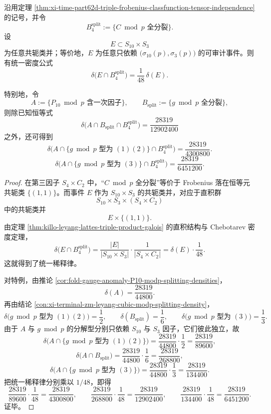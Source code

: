 \begin{theorem}\label{thm:xi-time-part62e-l4-fullsplit-universal-dilution}
沿用定理 \ref{thm:xi-time-part62d-triple-frobenius-classfunction-tensor-independence} 的记号，并令
\[
B_4^{\mathrm{split}}
:=
\{\text{\(C\bmod p\) 全分裂}\}.
\]
设
\[
E\subset S_{10}\times S_3
\]
为任意共轭类并；等价地，\(E\) 为任意只依赖 \(\bigl(\sigma_{10}(p),\sigma_3(p)\bigr)\) 的可审计事件。则有统一密度公式
\[
\boxed{\;
\delta\!\bigl(E\cap B_4^{\mathrm{split}}\bigr)=\frac{1}{48}\,\delta(E).\;}
\]

特别地，令
\[
A:=\{\text{\(P_{10}\bmod p\) 含一次因子}\},
\qquad
B_{\mathrm{split}}:=\{\text{\(g\bmod p\) 全分裂}\},
\]
则除已知恒等式
\[
\delta\!\bigl(A\cap B_{\mathrm{split}}\cap B_4^{\mathrm{split}}\bigr)
=
\frac{28319}{12902400}
\]
之外，还可得到
\[
\boxed{\;
\delta\!\bigl(A\cap\{g\bmod p\text{ 型为 }(1)(2)\}\cap B_4^{\mathrm{split}}\bigr)
=
\frac{28319}{4300800}.\;}
\]
\[
\boxed{\;
\delta\!\bigl(A\cap\{g\bmod p\text{ 型为 }(3)\}\cap B_4^{\mathrm{split}}\bigr)
=
\frac{28319}{6451200}.\;}
\]
\end{theorem}
\begin{proof}
在第三因子 \(S_4\times C_2\) 中，“\(C\bmod p\) 全分裂”等价于 Frobenius 落在恒等元共轭类 \(\{(1,1)\}\)。而事件 \(E\) 作为 \(S_{10}\times S_3\) 的共轭类并，对应于直积群
\[
S_{10}\times S_3\times (S_4\times C_2)
\]
中的共轭类并
\[
E\times\{(1,1)\}.
\]
由定理 \ref{thm:killo-leyang-lattes-triple-product-galois} 的直积结构与 Chebotarev 密度定理，
\[
\delta\!\bigl(E\cap B_4^{\mathrm{split}}\bigr)
=
\frac{|E|}{|S_{10}\times S_3|}\cdot \frac{1}{|S_4\times C_2|}
=
\delta(E)\cdot \frac{1}{48}.
\]
这就得到了统一稀释律。

对特例，由推论 \ref{cor:fold-gauge-anomaly-P10-modp-splitting-densities}，
\[
\delta(A)=\frac{28319}{44800}.
\]
再由结论 \ref{con:xi-terminal-zm-leyang-cubic-modp-splitting-density}，
\[
\delta\!\bigl(g\bmod p\text{ 型为 }(1)(2)\bigr)=\frac12,
\qquad
\delta(B_{\mathrm{split}})=\frac16,
\qquad
\delta\!\bigl(g\bmod p\text{ 型为 }(3)\bigr)=\frac13.
\]
由于 \(A\) 与 \(g\bmod p\) 的分解型分别只依赖 \(S_{10}\) 与 \(S_3\) 因子，它们彼此独立，故
\[
\delta\!\bigl(A\cap\{g\bmod p\text{ 型为 }(1)(2)\}\bigr)
=
\frac{28319}{44800}\cdot\frac12
=
\frac{28319}{89600},
\]
\[
\delta\!\bigl(A\cap B_{\mathrm{split}}\bigr)
=
\frac{28319}{44800}\cdot\frac16
=
\frac{28319}{268800},
\]
\[
\delta\!\bigl(A\cap\{g\bmod p\text{ 型为 }(3)\}\bigr)
=
\frac{28319}{44800}\cdot\frac13
=
\frac{28319}{134400}.
\]
把统一稀释律分别乘以 \(1/48\)，即得
\[
\frac{28319}{89600}\cdot \frac{1}{48}=\frac{28319}{4300800},
\qquad
\frac{28319}{268800}\cdot \frac{1}{48}=\frac{28319}{12902400},
\qquad
\frac{28319}{134400}\cdot \frac{1}{48}=\frac{28319}{6451200}.
\]
证毕。
\end{proof}


